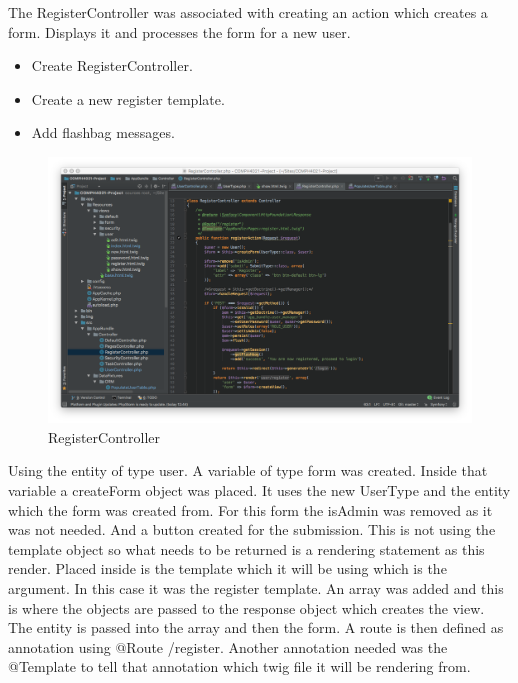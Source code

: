 The RegisterController was associated with creating an action which creates a form. Displays it and processes the form for a new user.

\begin{itemize}
  \item Create RegisterController.
    \item Create a new register template.
      \item Add flashbag messages.
\end{itemize}

\begin{figure}[htbp]
   \centering
   \includegraphics[width=400pt]{figures/register_controller.png} %
   \caption{RegisterController}
   \label{fig:RegisterController}
\end{figure}

Using the entity of type user. A variable of type form was created. Inside that variable a createForm object was placed. It uses the new UserType and the entity which the form was created from. For this form the isAdmin was removed as it was not needed. And a button created for the submission. This is not using the template object so what needs to be returned is a rendering statement as this render. Placed inside is the template which it will be using which is the argument. In this case it was the register template. An array was added and this is where the objects are passed to the response object which creates the view. The entity is passed into the array and then the form. A route is then defined as annotation using @Route /register. Another annotation needed was the @Template to tell that annotation which twig file it will be rendering from.

